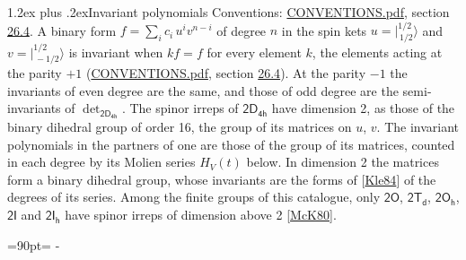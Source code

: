 \documentclass[10pt,a4paper]{article}
\makeatletter
\renewcommand\section{\@startsection{section}{1}{\z@}{-3ex plus -1ex minus -.2ex}%
  {1.2ex plus .2ex}{\normalfont\large\sffamily\bfseries\color{parttitle}}}
\newcommand{\needspace}[1]{\par\penalty-100\begingroup\dimen0=#1\relax\dimen2=\pagegoal
  \advance\dimen2-\pagetotal\ifdim\dimen0>\dimen2\relax\ifdim\dimen2>0pt\vfil\break\fi\fi
  \endgroup}
\numberwithin{equation}{section}
\newcommand{\grp}[1]{\mathsf{#1}}
\newcommand{\jm}[2]{\bigl\lvert{}^{#1}_{\,#2}\bigr\rangle}
\makeatother
\begin{document}
\section{Invariant polynomials}\label{s:invariants}
Conventions: \href{../../CONVENTIONS.pdf}{CONVENTIONS.pdf}, section \href{../../CONVENTIONS.pdf\#conv.26.4}{26.4}.
\leavevmode\label{n:local.binary.form}A binary form $f = \sum_i c_i\, u^i v^{n-i}$ of degree $n$ in the spin kets $u = \jm{1/2}{1/2}$ and $v = \jm{1/2}{-1/2}$ is invariant when $k f = f$ for every element $k$, the elements acting at the parity $+1$ (\href{../../CONVENTIONS.pdf}{CONVENTIONS.pdf}, section \href{../../CONVENTIONS.pdf\#conv.26.4}{26.4}). At the parity $-1$ the invariants of even degree are the same, and those of odd degree are the semi-invariants of $\det_{\grp{2D_{4h}}}$.
The spinor irreps of $\grp{2D_{4h}}$ have dimension 2, as those of the binary dihedral group of order 16, the group of its matrices on $u$, $v$. \label{n:function.hilbert}The invariant polynomials in the partners of one are those of the group of its matrices, counted in each degree by its Molien series $H_V(t)$ below. In dimension 2 the matrices form a binary dihedral group, whose invariants are the forms of [\href{../../../REFERENCES.pdf\#ref.Kle84}{Kle84}] of the degrees of its series. Among the finite groups of this catalogue, only $\grp{2O}$, $\grp{2T_{d}}$, $\grp{2O_{h}}$, $\grp{2I}$ and $\grp{2I_{h}}$ have spinor irreps of dimension above 2 [\href{../../../REFERENCES.pdf\#ref.McK80}{McK80}].
\needspace{90pt}
\end{document}
